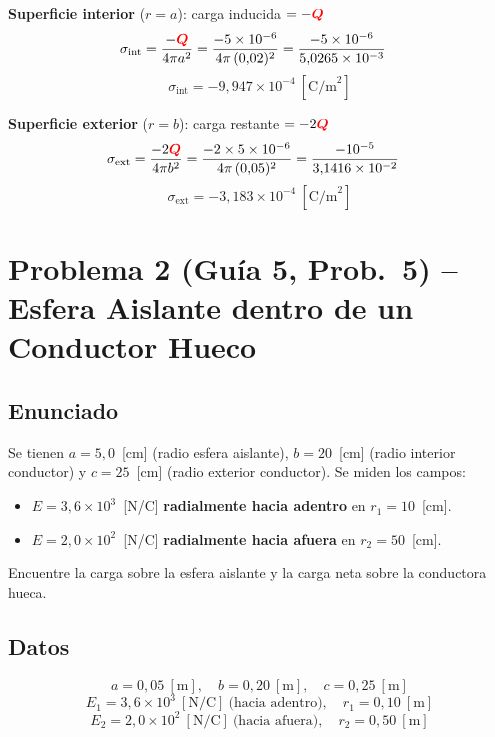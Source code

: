\documentclass[12pt,letterpaper]{article}
\newcommand{\Qr}{{\color{red}\bm{Q}}}
\begin{document}
\textbf{Superficie interior} ($r = a$): carga inducida $= -\Qr$
\begin{align*}
    \sigma_\text{int} &= \frac{-\Qr}{4\pi a^2}
    = \frac{-5\times10^{-6}}{4\pi\,(0{,}02)^2}
    = \frac{-5\times10^{-6}}{5{,}0265\times10^{-3}}
\end{align*}
\[
    \boxed{\sigma_\text{int} = -9{,}947\times10^{-4}\ \left[\text{C/m}^2\right]}
\]

\textbf{Superficie exterior} ($r = b$): carga restante $= -2\Qr$
\begin{align*}
    \sigma_\text{ext} &= \frac{-2\Qr}{4\pi b^2}
    = \frac{-2 \times 5\times10^{-6}}{4\pi\,(0{,}05)^2}
    = \frac{-10^{-5}}{3{,}1416\times10^{-2}}
\end{align*}
\[
    \boxed{\sigma_\text{ext} = -3{,}183\times10^{-4}\ \left[\text{C/m}^2\right]}
\]

\newpage
\section*{Problema 2 \textnormal{(Gu\'ia 5, Prob.\ 5)} -- Esfera Aislante dentro de un Conductor Hueco}

\subsection*{Enunciado}

Se tienen $a = 5{,}0$~[cm] (radio esfera aislante), $b = 20$~[cm] (radio interior conductor) y
$c = 25$~[cm] (radio exterior conductor). Se miden los campos:
\begin{itemize}
    \item $E = 3{,}6\times10^3$~[N/C] \textbf{radialmente hacia adentro} en $r_1 = 10$~[cm].
    \item $E = 2{,}0\times10^2$~[N/C] \textbf{radialmente hacia afuera} en $r_2 = 50$~[cm].
\end{itemize}

Encuentre la carga sobre la esfera aislante y la carga neta sobre la conductora hueca.

\subsection*{Datos}

\[
    a = 0{,}05\ [\text{m}],\quad b = 0{,}20\ [\text{m}],\quad c = 0{,}25\ [\text{m}]
\]
\[
    E_1 = 3{,}6\times10^3\ [\text{N/C}]\ \text{(hacia adentro)},\quad r_1 = 0{,}10\ [\text{m}]
\]
\[
    E_2 = 2{,}0\times10^2\ [\text{N/C}]\ \text{(hacia afuera)},\quad r_2 = 0{,}50\ [\text{m}]
\]
\end{document}
